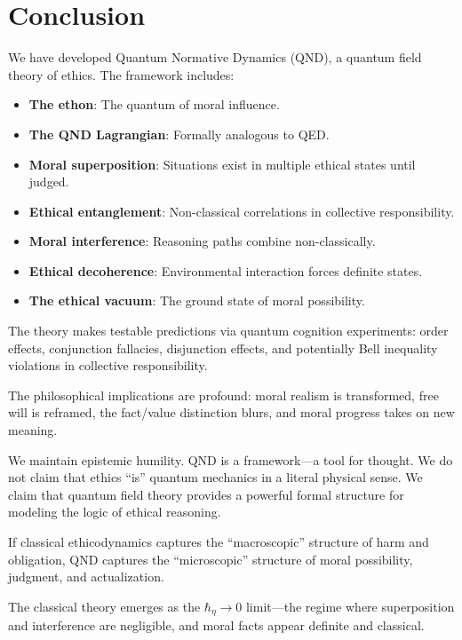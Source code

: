 \documentclass[12pt]{article}
\begin{document}
\section{Conclusion}

We have developed Quantum Normative Dynamics (QND), a quantum field theory of ethics. The framework includes:

\begin{itemize}
    \item \textbf{The ethon}: The quantum of moral influence.
    \item \textbf{The QND Lagrangian}: Formally analogous to QED.
    \item \textbf{Moral superposition}: Situations exist in multiple ethical states until judged.
    \item \textbf{Ethical entanglement}: Non-classical correlations in collective responsibility.
    \item \textbf{Moral interference}: Reasoning paths combine non-classically.
    \item \textbf{Ethical decoherence}: Environmental interaction forces definite states.
    \item \textbf{The ethical vacuum}: The ground state of moral possibility.
\end{itemize}

The theory makes testable predictions via quantum cognition experiments: order effects, conjunction fallacies, disjunction effects, and potentially Bell inequality violations in collective responsibility.

The philosophical implications are profound: moral realism is transformed, free will is reframed, the fact/value distinction blurs, and moral progress takes on new meaning.

We maintain epistemic humility. QND is a framework---a tool for thought. We do not claim that ethics ``is'' quantum mechanics in a literal physical sense. We claim that quantum field theory provides a powerful formal structure for modeling the logic of ethical reasoning.

If classical ethicodynamics captures the ``macroscopic'' structure of harm and obligation, QND captures the ``microscopic'' structure of moral possibility, judgment, and actualization.

The classical theory emerges as the $\hbar_\eta \to 0$ limit---the regime where superposition and interference are negligible, and moral facts appear definite and classical.
\end{document}
